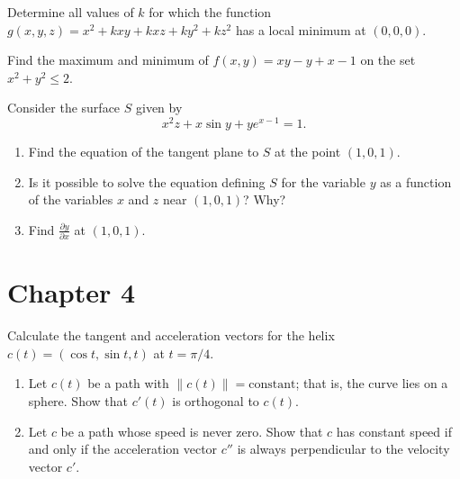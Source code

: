 \documentclass[openany]{book}
\begin{document}
\begin{prob}[24]
    Determine all values of \( k \) for which the function \( g(x, y, z) = x^2 + kxy + kxz + ky^2 + kz^2 \) has a local minimum at \( (0, 0, 0) \).
\end{prob}

\begin{prob}[30]
    Find the maximum and minimum of \( f(x, y) = xy - y + x - 1 \) on the set \( x^2 + y^2 \leq 2 \).
\end{prob}

\begin{prob}[38]
    Consider the surface \( S \) given by
    \[
    x^2z + x \sin y + ye^{x-1} = 1.
    \]
    \begin{enumerate}
        \item[(a)] Find the equation of the tangent plane to \( S \) at the point \( (1, 0, 1) \).
        \item[(b)] Is it possible to solve the equation defining \( S \) for the variable \( y \) as a function of the variables \( x \) and \( z \) near \( (1, 0, 1) \)? Why?
        \item[(c)] Find \( \frac{\partial y}{\partial x} \) at \( (1, 0, 1) \).
    \end{enumerate}
\end{prob}





\section{Chapter 4}
\begin{prob}[5]
    Calculate the tangent and acceleration vectors for the helix \( c(t) = (\cos t, \sin t, t) \) at \( t = \pi/4 \).
\end{prob}

\begin{prob}[8]
    \begin{enumerate}
        \item[(a)]  Let \( c(t) \) be a path with \( \|c(t)\| = \text{constant} \); that is, the curve lies on a sphere. Show that \( c'(t) \) is orthogonal to \( c(t) \).
        \item[(b)] Let \( c \) be a path whose speed is never zero. Show that \( c \) has constant speed if and only if the acceleration vector \( c'' \) is always perpendicular to the velocity vector \( c' \).
    \end{enumerate}
\end{prob}
\end{document}
